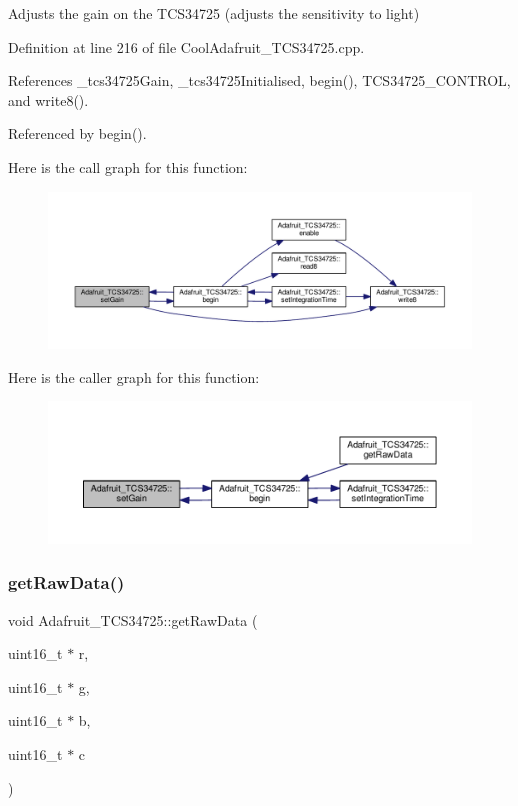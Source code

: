 Adjusts the gain on the T\+C\+S34725 (adjusts the sensitivity to light) 

Definition at line 216 of file Cool\+Adafruit\+\_\+\+T\+C\+S34725.\+cpp.



References \+\_\+tcs34725\+Gain, \+\_\+tcs34725\+Initialised, begin(), T\+C\+S34725\+\_\+\+C\+O\+N\+T\+R\+OL, and write8().



Referenced by begin().

Here is the call graph for this function\+:\nopagebreak
\begin{figure}[H]
\begin{center}
\leavevmode
\includegraphics[width=350pt]{df/d54/class_adafruit___t_c_s34725_a6be06315a9d33f76e44550f574f023a5_cgraph}
\end{center}
\end{figure}
Here is the caller graph for this function\+:\nopagebreak
\begin{figure}[H]
\begin{center}
\leavevmode
\includegraphics[width=350pt]{df/d54/class_adafruit___t_c_s34725_a6be06315a9d33f76e44550f574f023a5_icgraph}
\end{center}
\end{figure}
\mbox{\label{class_adafruit___t_c_s34725_abd9946a9baab1e0c76248cfe1864ea27}} 
\subsubsection{\texorpdfstring{get\+Raw\+Data()}{getRawData()}}
{\footnotesize\ttfamily void Adafruit\+\_\+\+T\+C\+S34725\+::get\+Raw\+Data (\begin{DoxyParamCaption}\item[{uint16\+\_\+t $\ast$}]{r,  }\item[{uint16\+\_\+t $\ast$}]{g,  }\item[{uint16\+\_\+t $\ast$}]{b,  }\item[{uint16\+\_\+t $\ast$}]{c }\end{DoxyParamCaption})}



